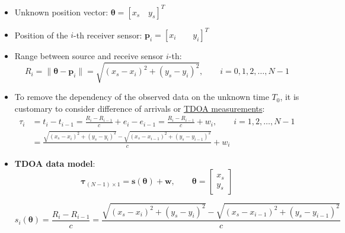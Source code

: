 \begin{itemize}
    \item Unknown position vector: \(\boldsymbol{\theta}=[x_s \quad y_s]^T\)
    \item Position of the \(i\)-th receiver sensor: \(\textbf{p}_i=[x_i\qquad y_i]^T\)
    \item Range between source and receive sensor \(i\)-th:
    \[
R_i = \lVert \boldsymbol{\theta} - \mathbf{p}_i \rVert
    = \sqrt{(x_s - x_i)^{2} + (y_s - y_i)^{2}},
    \qquad i = 0,1,2,\ldots,N-1
\]

    \item To remove the dependency of the observed data on the unknown time \(T_0\), it is customary to consider difference of arrivals or \underline{TDOA measurements}:
\begin{align*}
\tau_i
&= t_i - t_{i-1}
 = \frac{R_i - R_{i-1}}{c} + e_i - e_{i-1}
 = \frac{R_i - R_{i-1}}{c} + w_i,
 \qquad i = 1,2,\ldots,N-1 \\[6pt]
&= \frac{
\sqrt{(x_s - x_i)^{2} + (y_s - y_i)^{2}}
-
\sqrt{(x_s - x_{i-1})^{2} + (y_s - y_{i-1})^{2}}
}{c}
+ w_i
\end{align*}

    \item \textbf{TDOA data model}:
\[
\boldsymbol{\tau}_{(N-1)\times 1}
= \mathbf{s}(\boldsymbol{\theta}) + \mathbf{w},
\qquad
\boldsymbol{\theta} =
\begin{bmatrix}
x_s \\[2pt]
y_s
\end{bmatrix}
\]

\[
s_i(\boldsymbol{\theta})
= \frac{R_i - R_{i-1}}{c}
= \frac{
\sqrt{(x_s - x_i)^{2} + (y_s - y_i)^{2}}
-
\sqrt{(x_s - x_{i-1})^{2} + (y_s - y_{i-1})^{2}}
}{c}
\]


\end{itemize}
